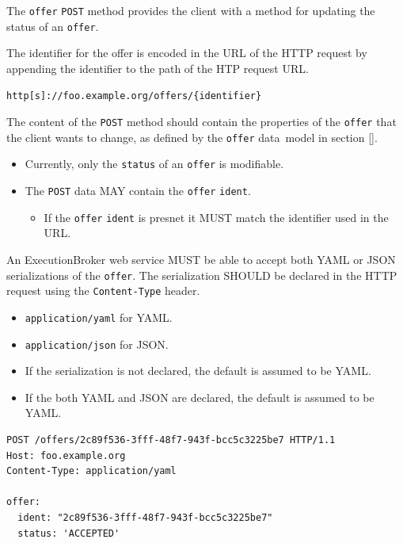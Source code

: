\documentclass[11pt,a4paper]{ivoa}
\newcommand{\json} {JSON}
\newcommand{\yaml} {YAML}
\newcommand{\datamodel} {data~model}
\newcommand{\webservice} {web service}
\newcommand{\execbrokerclass} {ExecutionBroker}
\newcommand{\codeword}[1] {\texttt{#1}}
\begin{document}
The \codeword{offer} \codeword{POST} method provides the client with a method for
updating the status of an \codeword{offer}.

The identifier for the offer is encoded in the URL of the HTTP request by appending the
identifier to the path of the HTP request URL.

\begin{lstlisting}[]
http[s]://foo.example.org/offers/{identifier}
\end{lstlisting}

The content of the \codeword{POST} method should contain the properties
of the \codeword{offer} that the client wants to change, as defined by
the \codeword{offer} \datamodel{} in section \ref{}.
\begin{itemize}
    \item Currently, only the \codeword{status} of an \codeword{offer} is modifiable.
    \item The \codeword{POST} data MAY contain the \codeword{offer} \codeword{ident}.
    \begin{itemize}
        \item If the \codeword{offer} \codeword{ident} is presnet it MUST match the identifier used in the URL.
    \end{itemize}
\end{itemize}

An \execbrokerclass{} \webservice{} MUST be able to accept both \yaml{} or \json{} serializations
of the \codeword{offer}.
The serialization SHOULD be declared in the HTTP request using the \codeword{Content-Type} header.
\begin{itemize}
    \item \codeword{application/yaml} for \yaml{}.
    \item \codeword{application/json} for \json{}.
    \item If the serialization is not declared, the default is assumed to be \yaml{}.
    \item If the both \yaml{} and \json{} are declared, the default is assumed to be \yaml{}.
\end{itemize}

\begin{lstlisting}[]
POST /offers/2c89f536-3fff-48f7-943f-bcc5c3225be7 HTTP/1.1
Host: foo.example.org
Content-Type: application/yaml

offer:
  ident: "2c89f536-3fff-48f7-943f-bcc5c3225be7"
  status: 'ACCEPTED'
\end{lstlisting}
\end{document}
